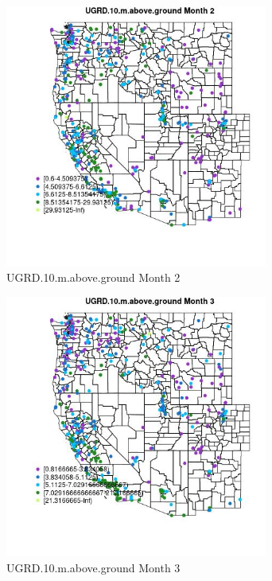\begin{figure} 
\centering  
\includegraphics[width=0.77\textwidth]{Code_Outputs/ML_input_report_ML_input_PM25_Step5_part_d_de_duplicated_aves_ML_input_MapObsMo2UGRD10maboveground.jpg} 
\caption{\label{fig:ML_input_report_ML_input_PM25_Step5_part_d_de_duplicated_aves_ML_inputMapObsMo2UGRD10maboveground}UGRD.10.m.above.ground Month 2} 
\end{figure} 
 

\begin{figure} 
\centering  
\includegraphics[width=0.77\textwidth]{Code_Outputs/ML_input_report_ML_input_PM25_Step5_part_d_de_duplicated_aves_ML_input_MapObsMo3UGRD10maboveground.jpg} 
\caption{\label{fig:ML_input_report_ML_input_PM25_Step5_part_d_de_duplicated_aves_ML_inputMapObsMo3UGRD10maboveground}UGRD.10.m.above.ground Month 3} 
\end{figure} 
 

